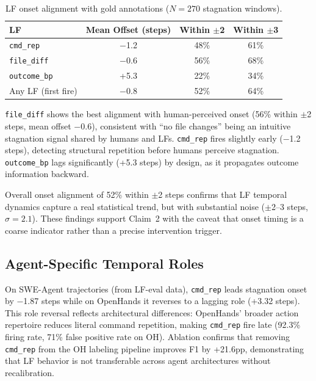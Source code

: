 \documentclass[11pt]{article}
\begin{document}
\begin{table}[t]
\centering
\small
\caption{LF onset alignment with gold annotations ($N\!=\!270$ stagnation windows).}
\label{tab:onset}
\begin{tabular}{lccc}
\toprule
LF & Mean Offset (steps) & Within $\pm$2 & Within $\pm$3 \\
\midrule
\texttt{cmd\_rep} & $-$1.2 & 48\% & 61\% \\
\texttt{file\_diff} & $-$0.6 & 56\% & 68\% \\
\texttt{outcome\_bp} & +5.3 & 22\% & 34\% \\
Any LF (first fire) & $-$0.8 & 52\% & 64\% \\
\bottomrule
\end{tabular}
\end{table}

\texttt{file\_diff} shows the best alignment with human-perceived onset (56\% within $\pm$2 steps, mean offset $-$0.6), consistent with ``no file changes'' being an intuitive stagnation signal shared by humans and LFs. \texttt{cmd\_rep} fires slightly early ($-$1.2 steps), detecting structural repetition before humans perceive stagnation. \texttt{outcome\_bp} lags significantly (+5.3 steps) by design, as it propagates outcome information backward.

Overall onset alignment of 52\% within $\pm$2 steps confirms that LF temporal dynamics capture a real statistical trend, but with substantial noise ($\pm$2--3 steps, $\sigma\!=\!2.1$). These findings support Claim~2 with the caveat that onset timing is a coarse indicator rather than a precise intervention trigger.

\subsection{Agent-Specific Temporal Roles}

On SWE-Agent trajectories (from LF-eval data), \texttt{cmd\_rep} leads stagnation onset by $-$1.87 steps while on OpenHands it reverses to a lagging role (+3.32 steps). This role reversal reflects architectural differences: OpenHands' broader action repertoire reduces literal command repetition, making \texttt{cmd\_rep} fire late (92.3\% firing rate, 71\% false positive rate on OH). Ablation confirms that removing \texttt{cmd\_rep} from the OH labeling pipeline improves F1 by +21.6pp, demonstrating that LF behavior is not transferable across agent architectures without recalibration.

\end{document}
